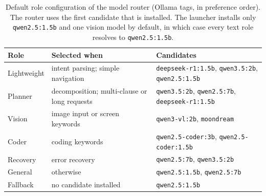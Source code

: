 \begin{table}[t]
\centering
\caption{Default role configuration of the model router (Ollama tags, in preference order). The router uses the first candidate that is installed. The launcher installs only \texttt{qwen2.5:1.5b} and one vision model by default, in which case every text role resolves to \texttt{qwen2.5:1.5b}.}
\label{tab:routing}
\footnotesize
\setlength{\tabcolsep}{3pt}
\begin{tabular}{@{}lp{2.55cm}p{3.35cm}@{}}
\toprule
Role & Selected when & Candidates \\
\midrule
Lightweight & intent parsing; simple navigation & \texttt{deepseek-r1:1.5b}, \texttt{qwen3.5:2b}, \texttt{qwen2.5:1.5b} \\
Planner & decomposition; multi-clause or long requests & \texttt{qwen3.5:2b}, \texttt{qwen2.5:7b}, \texttt{deepseek-r1:1.5b} \\
Vision & image input or screen keywords & \texttt{qwen3-vl:2b}, \texttt{moondream} \\
Coder & coding keywords & \texttt{qwen2.5-coder:3b}, \texttt{qwen2.5-coder:1.5b} \\
Recovery & error recovery & \texttt{qwen2.5:7b}, \texttt{qwen3.5:2b} \\
General & otherwise & \texttt{qwen2.5:1.5b}, \texttt{qwen2.5:7b} \\
Fallback & no candidate installed & \texttt{qwen2.5:1.5b} \\
\bottomrule
\end{tabular}
\end{table}
